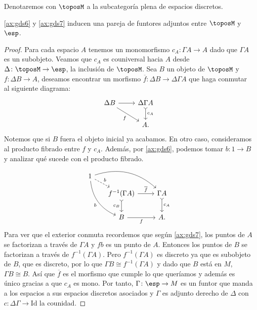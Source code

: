 \begin{definition}
  Denotaremos con $\toposM$ a la subcategoría plena de espacios discretos.
\end{definition}

\begin{theorem}[label=thm:funtordiscretos]
  \ref{ax:gds6} y \ref{ax:gds7} inducen una pareja de funtores adjuntos entre $\toposM$ y $\esp$.
\end{theorem}
\begin{proof}
  Para cada espacio $A$ 
  tenemos un monomorfismo $c_A\colon  \Gamma A \to A$ dado
  que $\Gamma A$ es un subobjeto. Veamos que $c_A$ es couniversal hacia
  $A$ desde $\Delta\colon  \toposM \to \esp$, la inclusión de $\toposM$. Sea $B$ un
  objeto de $\toposM$ y $f\colon  \Delta B \to A$,
  deseamos encontrar un morfismo $\overline{f}\colon  \Delta B \to \Delta\Gamma A$ que haga conmutar al siguiente diagrama:
  \begin{equation*}
    \begin{tikzcd}
      \Delta B \ar{r} \ar[swap]{rd}{f} & \Delta\Gamma A \ar[tail]{d}{c_A} \\
        & A.
    \end{tikzcd}
  \end{equation*}
  Notemos que si $B$ fuera el objeto inicial ya acabamos. En otro caso, 
  consideramos al producto fibrado entre $f$ y $c_A$. Además, por \ref{ax:gds6}, podemos
  tomar $b\colon  1\to B$ y analizar qué sucede con el producto fibrado.
  \begin{equation*}
    \begin{tikzcd}
        1\ar[bend left=30]{rrd}\ar[bend right=30]{rdd}[swap]{b}
          \ar[dashed]{rd}{b}\\[-2ex]
        &[-2ex] f^{-1} (\Gamma A)\ar{r}{\overline{f}} \ar[tail]{d}[swap]{c_B} & \Gamma A\ar[tail]{d}{c_A}\\
        & B\ar{r}[swap]{f} & A.
    \end{tikzcd}
  \end{equation*}
  Para ver que el exterior conmuta recordemos que según \ref{ax:gds7}, los puntos de $A$ se factorizan a
  través de $\Gamma A$ y $fb$ es un punto de $A$. Entonces los puntos de $B$ se factorizan
  a través de $f^{-1} (\Gamma A)$. Pero $f^{-1} (\Gamma A)$ es discreto ya que es subobjeto
  de $B$, que es discreto, por lo que $\Gamma B \cong f^{-1} (\Gamma A)$ y dado que $B$ está
  en $M$, $\Gamma B \cong B$. Así que $\overline{f}$ es el morfismo que cumple lo que queríamos
  y además es único gracias a que $c_A$ es mono. Por tanto, $\Gamma\colon \esp \to M$ es
  un funtor que manda a los espacios a sus espacios discretos asociados
  y $\Gamma$ es adjunto derecho de $\Delta$ con 
  $c\colon \Delta\Gamma \to \text{Id}$ la counidad.
  
\end{proof}

